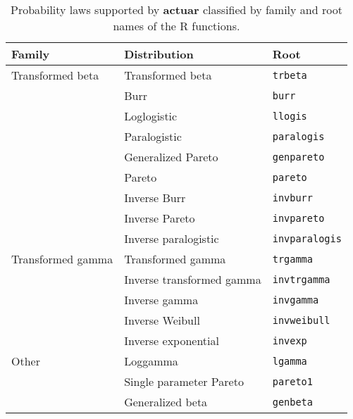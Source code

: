 \documentclass[x11names]{article}
\newcommand{\proglang}[1]{\textsf{#1}}
\newcommand{\pkg}[1]{\textbf{#1}}
\newcommand{\code}[1]{\texttt{#1}}
\begin{document}
\begin{table}
  \centering
  \begin{tabular}{lll}
    \toprule
    Family & Distribution & Root \\
    \midrule
    Transformed beta  & Transformed beta & \code{trbeta} \\
                      & Burr & \code{burr} \\
                      & Loglogistic & \code{llogis} \\
                      & Paralogistic & \code{paralogis} \\
                      & Generalized Pareto & \code{genpareto} \\
                      & Pareto & \code{pareto} \\
                      & Inverse Burr & \code{invburr} \\
                      & Inverse Pareto & \code{invpareto} \\
                      & Inverse paralogistic & \code{invparalogis} \\
    \midrule
    Transformed gamma & Transformed gamma & \code{trgamma} \\
                      & Inverse transformed gamma & \code{invtrgamma} \\
                      & Inverse gamma & \code{invgamma} \\
                      & Inverse Weibull & \code{invweibull} \\
                      & Inverse exponential & \code{invexp} \\
    \midrule
    Other             & Loggamma & \code{lgamma} \\
                      & Single parameter Pareto & \code{pareto1} \\
                      & Generalized beta & \code{genbeta} \\
    \bottomrule
  \end{tabular}
  \caption{Probability laws supported by \pkg{actuar} classified by
    family and root names of the \proglang{R} functions.}
  \label{tab:continuous}
\end{table}
\end{document}
